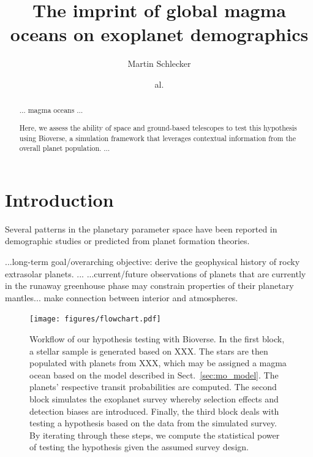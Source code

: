 \documentclass[modern]{aastex631}
\begin{document}
\title{The imprint of global magma oceans on exoplanet demographics}

\author[0000-0001-8355-2107]{Martin Schlecker}
\author{al.}


\begin{abstract}
    $\ldots$ magma oceans $\ldots$

    Here, we assess the ability of space and ground-based telescopes to test this hypothesis using Bioverse, a simulation framework that leverages contextual information from the overall planet population.
    $\ldots$

\end{abstract}

\section{Introduction}
Several patterns in the planetary parameter space have been reported in demographic studies or predicted from planet formation theories.
\begin{note}
    ...long-term goal/overarching objective: derive the geophysical history of rocky extrasolar planets.
   ...
    ...current/future observations of planets that are currently in the runaway greenhouse phase may constrain properties of their planetary mantles... make connection between interior and atmospheres.
\end{note}

\begin{figure}
    \begin{centering}
        \texttt{[image: figures/flowchart.pdf]}
        \caption{Workflow of our hypothesis testing with Bioverse. In the first block, a stellar sample is generated based on XXX. The stars are then populated with planets from XXX, which may be assigned a magma ocean based on the model described in Sect.~\ref{sec:mo_model}. The planets' respective transit probabilities are computed. The second block simulates the exoplanet survey whereby selection effects and detection biases are introduced. Finally, the third block deals with testing a hypothesis based on the data from the simulated survey. By iterating through these steps, we compute the statistical power of testing the hypothesis given the assumed survey design.}
        \label{fig:flowchart}
    \end{centering}
\end{figure}
\end{document}
